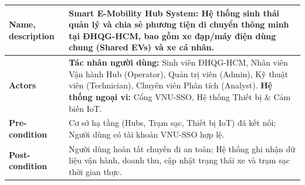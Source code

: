 \documentclass[12pt,a4paper]{report}
\begin{document}
\noindent\begin{tabularx}{\textwidth}{|p{3.5cm}|X|}
\hline
\textbf{Name, description} & \textbf{Smart E-Mobility Hub System:} Hệ thống sinh thái quản lý và chia sẻ phương tiện di chuyển thông minh tại ĐHQG-HCM, bao gồm xe đạp/máy điện dùng chung (Shared EVs) và xe cá nhân. \\
\hline
\textbf{Actors} & \textbf{Tác nhân người dùng:} Sinh viên ĐHQG-HCM, Nhân viên Vận hành Hub (Operator), Quản trị viên (Admin), Kỹ thuật viên (Technician), Chuyên viên Phân tích (Analyst). \newline \textbf{Hệ thống ngoại vi:} Cổng VNU-SSO, Hệ thống Thiết bị \& Cảm biến IoT. \\
\hline
\textbf{Pre-condition} & Cơ sở hạ tầng (Hubs, Trạm sạc, Thiết bị IoT) đã kết nối; Người dùng có tài khoản VNU-SSO hợp lệ. \\
\hline
\textbf{Post-condition} & Người dùng hoàn tất chuyến đi an toàn; Hệ thống ghi nhận dữ liệu vận hành, doanh thu, cập nhật trạng thái xe và trạm sạc thời gian thực. \\
\hline
\end{tabularx}
\vspace{-1pt}
\end{document}
